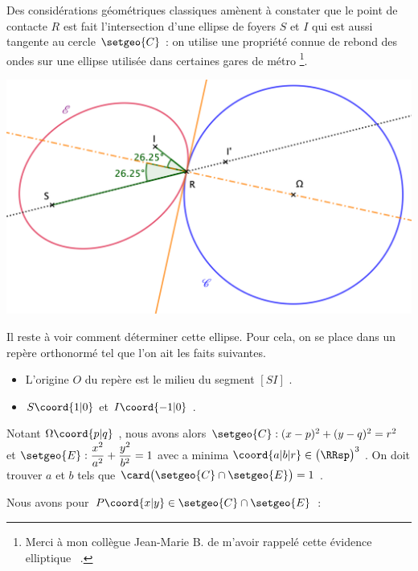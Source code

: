 Des considérations géométriques classiques amènent à constater que le point de contacte $R$ est fait l'intersection d'une ellipse de foyers $S$ et $I$ qui est aussi tangente au cercle $\setgeo{C}$ : on utilise une propriété connue de rebond des ondes sur une ellipse utilisée dans certaines gares de métro
\footnote{
	Merci à mon collègue Jean-Marie B. de m'avoir rappelé cette \og évidence elliptique \fg\ .
}.

\begin{center}
	\includegraphics[scale=1.25]{ellipse.png}
\end{center}


Il reste à voir comment déterminer cette ellipse. Pour cela, on se place dans un repère orthonormé tel que l'on ait les faits suivantes.

\begin{itemize}[label=\small\textbullet]
	\item L'origine $O$ du repère est le milieu du segment $[SI]$ .

	\item $S\coord{1 | 0}$ et $I\coord{-1 | 0}$ .
\end{itemize}


Notant $\Omega\coord{p | q}$ , nous avons alors
$\setgeo{C} : (x - p)^2 + (y - q)^2 = r^2$
et
$\setgeo{E} : \dfrac{x^2}{a^2} + \dfrac{y^2}{b^2} = 1$ avec a minima $\coord{a | b | r} \in \big(\RRsp\big)^3$ .
On doit trouver $a$ et $b$ tels que $\card \big( \setgeo{C} \cap \setgeo{E} \big) = 1$ .


\bigskip


Nous avons pour $P\coord{x | y} \in \setgeo{C} \cap \setgeo{E}$ :

\medskip

